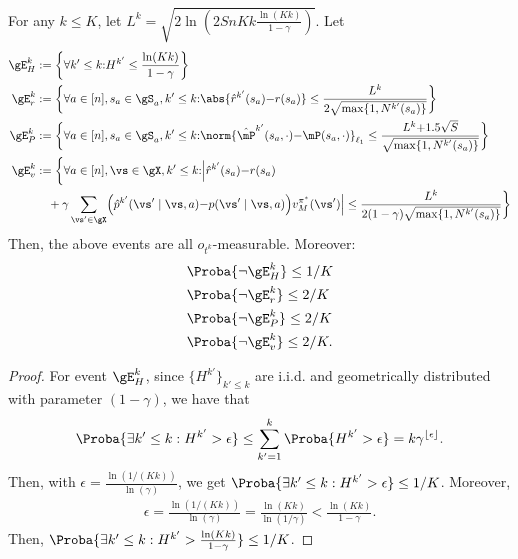 \begin{subappendices}
\begin{lem}
    \label{lem:concentration}
    For any $k\le K$, let $L^{k}=\sqrt{2\ln\left(2SnKk\frac{\ln(Kk)}{1-\gamma}\right)}$. Let
    \begin{align}
        \gE^{k}_H&:= \bigg\{\forall k'\le k{:} H^{k'}\le \frac{\ln(Kk)}{1-\gamma}\bigg\} \label{eq:conc_h}\\
        \gE^{k}_r&:= \bigg\{\forall a\in[n], s_a\in\gS_a, k'\le k{:} \abs{\hat{r}^{k'}(s_a){-}r(s_a)} \le \frac{L^{k}}{2\sqrt{\max\{1,N^{k'}(s_a)\}}}\bigg\} \label{eq:conc_r} \\
        \gE^{k}_P&:= \bigg\{\forall a\in[n], s_a\in\gS_a, k'\le k{:} \norm{\hat{\mP}^{k'}(s_a,\cdot){-}\mP(s_a, \cdot)}_{\ell_1} \le \frac{L^{k}{+}1.5\sqrt{S}}{\sqrt{\max\{1,N^{k'}(s_a)\}}}\bigg\} \label{eq:conc_q} \\
        \gE^{k}_v&:= \bigg\{\forall a\in[n], \vs\in\gX, k'\le k{:} \Bigl\vert\hat{r}^{k'}(s_a){-}r(s_a) \nonumber \\
                   &\quad +\gamma \sum_{\vs'\in\gX}\Bigl(\hat{p}^{k'}(\vs' \mid\vs, a) {-}p(\vs'\mid\vs,a)\Bigr)v_M^{\pi^*}(\vs')\Bigr\vert
        \le \frac{L^{k}}{2(1-\gamma)\sqrt{\max\{1,N^{k'}(s_a)\}}}\bigg\} \label{eq:conc_V}
    \end{align}
    Then, the above events are all $o_{t^k}$-measurable. Moreover:
    \begin{align*}
        &\Proba{\lnot\gE^{k}_H}\le1/K \\ 
        &\Proba{\lnot \gE^{k}_r }\le 2/K \\
        &\Proba{\lnot \gE^{k}_P }\le 2/K \\
        &\Proba{\lnot \gE^{k}_v }\le 2/K.
    \end{align*} 
\end{lem}

\begin{proof}
    For event $\gE^{k}_H$, since $\{H^{k'}\}_{k'\le k}$ are i.i.d. and geometrically distributed with parameter $(1-\gamma)$, we have that
    \begin{align*}
        \Proba{\exists k'\le k: H^{k'}>\epsilon} \le \sum_{k'=1}^{k} \Proba{H^{k'}>\epsilon} =k\gamma^{\lfloor \epsilon\rfloor}.
    \end{align*}
    Then, with $\epsilon=\frac{\ln(1/(Kk))}{\ln(\gamma)}$, we get $\Proba{\exists k'\le k: H^{k'}>\epsilon}\le 1/K$.
    Moreover,
    \begin{align*}
        \epsilon = \frac{\ln(1/(Kk))}{\ln(\gamma)}= \frac{\ln(Kk)}{\ln(1/\gamma)} < \frac{\ln(Kk)}{1-\gamma}.
    \end{align*}
    Then, $\Proba{\exists k'\le k: H^{k'}>\frac{\ln(Kk)}{1-\gamma}}\le 1/K$.


\end{proof}
\end{subappendices}
